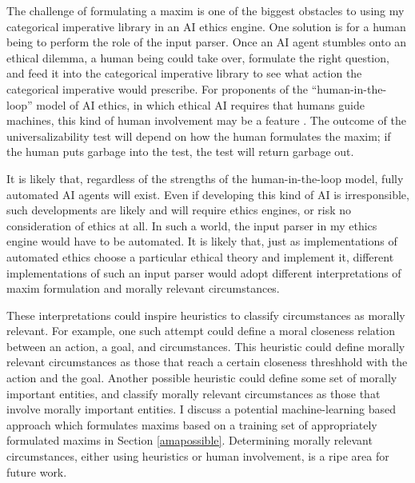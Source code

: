 \begin{isabellebody}
\begin{isamarkuptext}
The challenge of formulating a maxim is one of the biggest obstacles to using my categorical imperative library
in an AI ethics engine. One solution is for a human being to perform the role of the input
parser. Once an AI agent stumbles onto an ethical dilemma, a human being could take over, formulate 
the right question, and feed it into the categorical imperative library to see what action the categorical 
imperative would prescribe. For proponents of the ``human-in-the-loop'' model of AI ethics, in which 
ethical AI requires that humans guide machines, this kind of human involvement may be a feature \citep{loop}.
The outcome of the universalizability test will depend on how the human formulates the maxim; if the 
human puts garbage into the test, the test will return garbage out.

It is likely that, regardless of the strengths of the human-in-the-loop model, fully automated AI 
agents will exist. Even if developing this kind of AI is irresponsible,
such developments are likely and will require ethics engines, or risk no consideration of ethics at all.
In such a world, the input parser in my ethics engine would have to be automated.
It is likely that, just as implementations of automated ethics choose 
a particular ethical theory and implement it, different implementations of such an input parser would 
adopt different interpretations of maxim formulation and morally relevant circumstances. 

These interpretations could inspire heuristics to classify circumstances as morally 
relevant. For example, one such attempt could define a moral closeness relation between an action, a 
goal, and circumstances. This heuristic could define morally relevant circumstances as those that 
reach a certain closeness threshhold with the action and the goal. Another possible heuristic could 
define some set of morally important entities, and classify morally relevant circumstances as those
that involve morally important entities. I discuss a potential machine-learning based approach which formulates
maxims based on a training set of appropriately formulated maxims in Section \ref{amapossible}.
Determining morally relevant circumstances, either using heuristics or human involvement, is a ripe 
area for future work.


\end{isamarkuptext}
\end{isabellebody}
